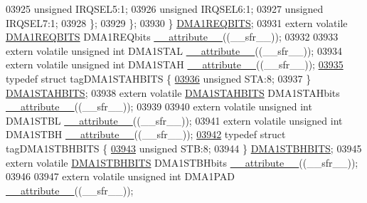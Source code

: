 \begin{DoxyCode}
03925       \textcolor{keywordtype}{unsigned} IRQSEL5:1;
03926       \textcolor{keywordtype}{unsigned} IRQSEL6:1;
03927       \textcolor{keywordtype}{unsigned} IRQSEL7:1;
03928     \};
03929   \};
03930 \} \hyperlink{a00008_d0/da0/a00403}{DMA1REQBITS};
03931 \textcolor{keyword}{extern} \textcolor{keyword}{volatile} \hyperlink{a00008_d0/da0/a00403}{DMA1REQBITS} DMA1REQbits \hyperlink{a00009_a493c46f03454991ccc5aa7a6e1dfb2a7}{\_\_attribute\_\_}((\_\_sfr\_\_));
03932 
03933 \textcolor{keyword}{extern} \textcolor{keyword}{volatile} \textcolor{keywordtype}{unsigned} \textcolor{keywordtype}{int}  DMA1STAL \hyperlink{a00009_a493c46f03454991ccc5aa7a6e1dfb2a7}{\_\_attribute\_\_}((\_\_sfr\_\_));
03934 \textcolor{keyword}{extern} \textcolor{keyword}{volatile} \textcolor{keywordtype}{unsigned} \textcolor{keywordtype}{int}  DMA1STAH \hyperlink{a00009_a493c46f03454991ccc5aa7a6e1dfb2a7}{\_\_attribute\_\_}((\_\_sfr\_\_));
\hypertarget{a00009_source_l03935}{}\hyperlink{a00008}{03935} \textcolor{keyword}{typedef} \textcolor{keyword}{struct }tagDMA1STAHBITS \{
\hypertarget{a00009_source_l03936}{}\hyperlink{a00008_a0eec78ddd2c12af678d5fab70fe62d14}{03936}   \textcolor{keywordtype}{unsigned} STA:8;
03937 \} \hyperlink{a00008_d1/d8b/a00406}{DMA1STAHBITS};
03938 \textcolor{keyword}{extern} \textcolor{keyword}{volatile} \hyperlink{a00008_d1/d8b/a00406}{DMA1STAHBITS} DMA1STAHbits \hyperlink{a00009_a493c46f03454991ccc5aa7a6e1dfb2a7}{\_\_attribute\_\_}((\_\_sfr\_\_));
03939 
03940 \textcolor{keyword}{extern} \textcolor{keyword}{volatile} \textcolor{keywordtype}{unsigned} \textcolor{keywordtype}{int}  DMA1STBL \hyperlink{a00009_a493c46f03454991ccc5aa7a6e1dfb2a7}{\_\_attribute\_\_}((\_\_sfr\_\_));
03941 \textcolor{keyword}{extern} \textcolor{keyword}{volatile} \textcolor{keywordtype}{unsigned} \textcolor{keywordtype}{int}  DMA1STBH \hyperlink{a00009_a493c46f03454991ccc5aa7a6e1dfb2a7}{\_\_attribute\_\_}((\_\_sfr\_\_));
\hypertarget{a00009_source_l03942}{}\hyperlink{a00008}{03942} \textcolor{keyword}{typedef} \textcolor{keyword}{struct }tagDMA1STBHBITS \{
\hypertarget{a00009_source_l03943}{}\hyperlink{a00008_a9bd043a4db27e09b5035a563a8758fe7}{03943}   \textcolor{keywordtype}{unsigned} STB:8;
03944 \} \hyperlink{a00008_d1/d98/a00407}{DMA1STBHBITS};
03945 \textcolor{keyword}{extern} \textcolor{keyword}{volatile} \hyperlink{a00008_d1/d98/a00407}{DMA1STBHBITS} DMA1STBHbits \hyperlink{a00009_a493c46f03454991ccc5aa7a6e1dfb2a7}{\_\_attribute\_\_}((\_\_sfr\_\_));
03946 
03947 \textcolor{keyword}{extern} \textcolor{keyword}{volatile} \textcolor{keywordtype}{unsigned} \textcolor{keywordtype}{int}  DMA1PAD \hyperlink{a00009_a493c46f03454991ccc5aa7a6e1dfb2a7}{\_\_attribute\_\_}((\_\_sfr\_\_));

\end{DoxyCode}
